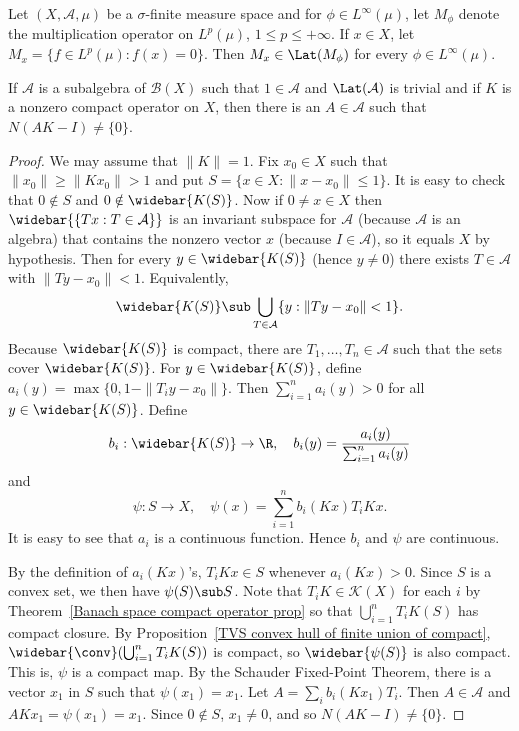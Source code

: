 \begin{example}
Let $(X,\mathcal{A},\mu)$ be a $\sigma$-finite measure space and for $\phi\in L^\infty(\mu)$, let $M_\phi$ denote the multiplication operator on $L^p(\mu)$, $1\leq p\leq+\infty$. If $x\in X$, let $M_x=\{f\in L^p(\mu):f(x)=0\}$. Then $M_x\in\Lat(M_\phi)$ for every $\phi\in L^\infty(\mu)$.
\end{example}
\begin{lemma}
If $\mathcal{A}$ is a subalgebra of $\mathcal{B}(X)$ such that $1\in\mathcal{A}$ and $\Lat(\mathcal{A})$ is trivial and if $K$ is a nonzero compact operator on $X$, then there is an $A\in\mathcal{A}$ such that $N(AK-I)\neq\{0\}$.
\end{lemma}
\begin{proof}
We may assume that $\|K\|=1$. Fix $x_0\in X$ such that $\|x_0\|\geq \|Kx_0\|>1$ and put $S=\{x\in X:\|x-x_0\|\leq 1\}$. It is easy to check that $0\notin S$ and $0\notin\widebar{K(S)}$. Now if $0\neq x\in X$ then $\widebar{\{Tx:T\in\mathcal{A}\}}$ is an invariant subspace for $\mathcal{A}$ (because $\mathcal{A}$ is an algebra) that contains the nonzero vector $x$ (because $I\in\mathcal{A}$), so it equals $X$ by hypothesis. Then for every $y\in\widebar{K(S)}$ (hence $y\neq 0$) there exists $T\in\mathcal{A}$ with $\|Ty-x_0\|<1$. Equivalently,
\[\widebar{K(S)}\sub\bigcup_{T\in\mathcal{A}}\{y:\|Ty-x_0\|<1\}.\]
Because $\widebar{K(S)}$ is compact, there are $T_1,\dots,T_n\in\mathcal{A}$ such that the sets cover $\widebar{K(S)}$. For $y\in\widebar{K(S)}$, define $a_i(y)=\max\{0,1-\|T_iy-x_0\|\}$. Then $\sum_{i=1}^{n}a_i(y)>0$ for all $y\in\widebar{K(S)}$. Define
\[b_i:\widebar{K(S)}\to\R,\quad b_i(y)=\frac{a_i(y)}{\sum_{i=1}^{n}a_i(y)}\]
and
\[\psi:S\to X,\quad \psi(x)=\sum_{i=1}^{n}b_i(Kx)T_iKx.\]
It is easy to see that $a_i$ is a continuous function. Hence $b_i$ and $\psi$ are continuous.\par
By the definition of $a_i(Kx)$'s, $T_iKx\in S$ whenever $a_i(Kx)>0$. Since $S$ is a convex set, we then have $\psi(S)\sub S$. Note that $T_iK\in\mathcal{K}(X)$ for each $i$ by Theorem~\ref{Banach space compact operator prop} so that $\bigcup_{i=1}^{n}T_iK(S)$ has compact closure. By Proposition~\ref{TVS convex hull of finite union of compact}, $\widebar{\conv}(\bigcup_{i=1}^{n}T_iK(S))$ is compact, so $\widebar{\psi(S)}$ is also compact. This is, $\psi$ is a compact map. By the Schauder Fixed-Point Theorem, there is a vector $x_1$ in $S$ such that $\psi(x_1)=x_1$. Let $A=\sum_ib_i(Kx_1)T_i$. Then $A\in\mathcal{A}$ and $AKx_1=\psi(x_1)=x_1$. Since $0\notin S$, $x_1\neq 0$, and so $N(AK-I)\neq\{0\}$.
\end{proof}
